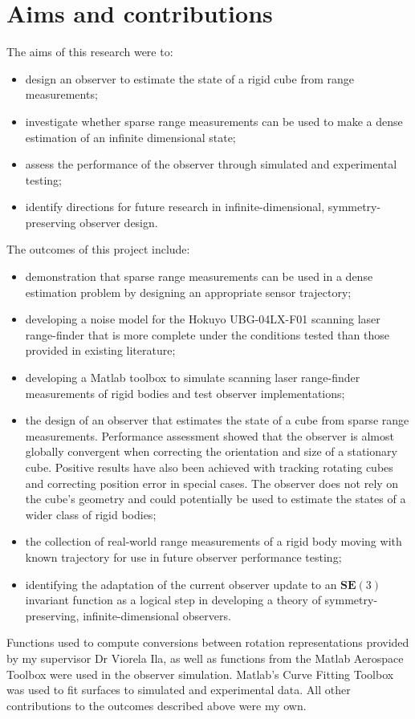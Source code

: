 \chapter*{Aims and contributions}

The aims of this research were to:
\begin{itemize}
\item design an observer to estimate the state of a rigid cube from range measurements;
\item investigate whether sparse range measurements can be used to make a dense estimation of an infinite dimensional state;
\item assess the performance of the observer through simulated and experimental testing; 
\item identify directions for future research in infinite-dimensional, symmetry-preserving observer design.
\end{itemize}

The outcomes of this project include:
\begin{itemize}
\item demonstration that sparse range measurements can be used in a dense estimation problem by designing an appropriate sensor trajectory;
\item developing a noise model for the Hokuyo UBG-04LX-F01 scanning laser range-finder that is more complete under the conditions tested than those provided in existing literature;
\item developing a Matlab toolbox to simulate scanning laser range-finder measurements of rigid bodies and test observer implementations;
\item the design of an observer that estimates the state of a cube from sparse range measurements. Performance assessment showed that the observer is almost globally convergent when correcting the orientation and size of a stationary cube. Positive results have also been achieved with tracking rotating cubes and correcting position error in special cases. The observer does not rely on the cube's geometry and could potentially be used to estimate the states of a wider class of rigid bodies;
\item the collection of real-world range measurements of a rigid body moving with known trajectory for use in future observer performance testing;
\item identifying the adaptation of the current observer update to an $\mathbf{SE}(3)$ invariant function as a logical step in developing a theory of symmetry-preserving, infinite-dimensional observers.
\end{itemize}

Functions used to compute conversions between rotation representations provided by my supervisor Dr Viorela Ila, as well as functions from the Matlab Aerospace Toolbox were used in the observer simulation. Matlab's Curve Fitting Toolbox was used to fit surfaces to simulated and experimental data.
All other contributions to the outcomes described above were my own.